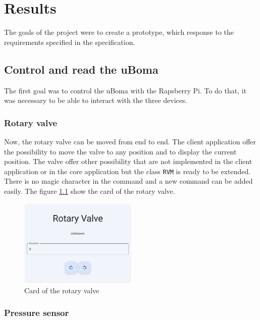 \chapter{Results}
\label{ch:results}

The goals of the project were to create a prototype, which response to the requirements specified in the specification.

\section{Control and read the uBoma}
\label{ch:results:control}

The first goal was to control the uBoma with the Rapsberry Pi.
To do that, it was necessary to be able to interact with the three devices.


\subsection{Rotary valve}
\label{ch:results:control:rotary}

Now, the rotary valve can be moved from end to end.
The client application offer the possibility to move the valve to any position and to display the current position.
The valve offer other possibility that are not implemented in the client application or in the core application but the class \texttt{RVM} is ready to be extended.
There is no magic character in the command and a new command can be added easily.
The figure \ref{ch:results:control:rotary:figure} show the card of the rotary valve.

\begin{figure}[H]
    \centering
    \includegraphics[width=0.5\textwidth]{img/results_rotary-card.png}
    \caption{Card of the rotary valve}
    \label{ch:results:control:rotary:figure}
\end{figure}

\subsection{Pressure sensor}
\label{ch:results:control:pressure}

